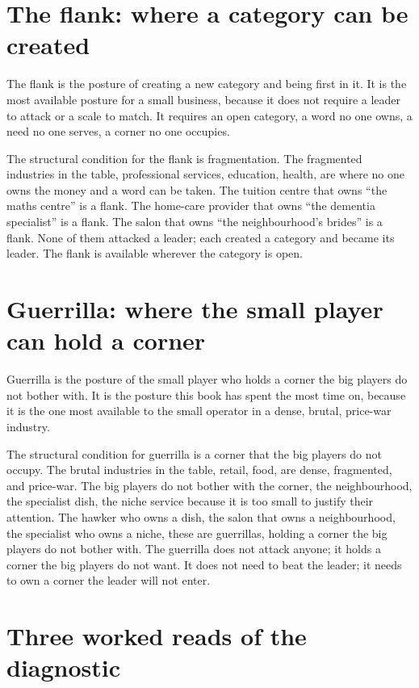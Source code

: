 \documentclass[10pt,twoside,openany]{memoir}
\newcommand{\needspacehead}{\needspace{4\baselineskip}}
\let\oldsection\section
\renewcommand{\section}{\needspacehead\oldsection}
\begin{document}
{{\section{The flank: where a category can be
created}\label{the-flank-where-a-category-can-be-created}

The flank is the posture of creating a new category and being first in
it. It is the most available posture for a small business, because it
does not require a leader to attack or a scale to match. It requires an
open category, a word no one owns, a need no one serves, a corner no one
occupies.

The structural condition for the flank is fragmentation. The fragmented
industries in the table, professional services, education, health, are
where no one owns the money and a word can be taken. The tuition centre
that owns ``the maths centre'' is a flank. The home-care provider that
owns ``the dementia specialist'' is a flank. The salon that owns ``the
neighbourhood's brides'' is a flank. None of them attacked a leader;
each created a category and became its leader. The flank is available
wherever the category is open.

\section{Guerrilla: where the small player can hold a
corner}\label{guerrilla-where-the-small-player-can-hold-a-corner}

Guerrilla is the posture of the small player who holds a corner the big
players do not bother with. It is the posture this book has spent the
most time on, because it is the one most available to the small operator
in a dense, brutal, price-war industry.

The structural condition for guerrilla is a corner that the big players
do not occupy. The brutal industries in the table, retail, food, are
dense, fragmented, and price-war. The big players do not bother with the
corner, the neighbourhood, the specialist dish, the niche service
because it is too small to justify their attention. The hawker who owns
a dish, the salon that owns a neighbourhood, the specialist who owns a
niche, these are guerrillas, holding a corner the big players do not
bother with. The guerrilla does not attack anyone; it holds a corner the
big players do not want. It does not need to beat the leader; it needs
to own a corner the leader will not enter.

\section{Three worked reads of the
diagnostic}\label{three-worked-reads-of-the-diagnostic}

}}
\end{document}
